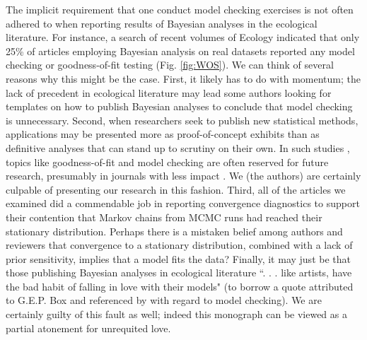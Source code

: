 \documentclass[12pt,english]{article}
\begin{document}
\begin{spacing}{1.9}
The implicit requirement that one conduct model checking exercises is not often adhered to when reporting results of Bayesian analyses in the ecological literature.  For instance, a search of recent volumes of Ecology indicated that only 25\% of articles employing Bayesian analysis on real datasets reported any model checking or goodness-of-fit testing (Fig. \ref{fig:WOS}).  We can think of several reasons why this might be the case.  First, it likely has to do with momentum; the lack of precedent in ecological literature may lead some authors looking for templates on how to publish Bayesian analyses to conclude that model checking is unnecessary.  Second, when researchers seek to publish new statistical methods, applications may be presented more as proof-of-concept exhibits than as definitive analyses that can stand up to scrutiny on their own. In such studies \citep[and textbooks; see e.g.,][]{RoyleDorazio2008}, topics like goodness-of-fit and model checking are often reserved for future research, presumably in journals with less impact .  We (the authors) are certainly culpable of presenting our research in this fashion.  Third, all of the articles we examined did a commendable job in reporting convergence diagnostics to support their contention that Markov chains from MCMC runs had reached their stationary distribution.  Perhaps there is a mistaken belief among authors and reviewers that convergence to a stationary distribution, combined with a lack of prior sensitivity, implies that a model fits the data?  Finally, it may just be that those publishing Bayesian analyses in ecological literature ``. . . like artists, have the bad habit of falling in love with their models" (to borrow a quote attributed to G.E.P. Box and referenced by \citet{LinkBarker2010} with regard to model checking).  We are certainly guilty of this fault as well; indeed this monograph can be viewed as a partial atonement for unrequited love.


\end{spacing}
\end{document}
